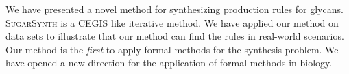 % 
We have presented a novel method for synthesizing production rules for glycans.
\textsc{SugarSynth} is a CEGIS like iterative method.
We have applied our method on data sets to illustrate that our method
can find the rules in real-world scenarios.
Our method is the {\em first} to apply formal methods for the synthesis problem.
We have opened a new direction for the application of formal methods in biology.





